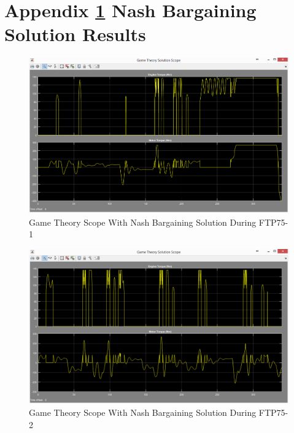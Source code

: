 \chapter{Appendix \ref{app:2} Nash Bargaining Solution Results}
\label{app:2}

\begin{figure}[h]
\centering
\includegraphics[scale=0.51]{figures/NashSolution/FTP75-1/gameTheory17Juni}
\caption{Game Theory Scope With Nash Bargaining Solution During FTP75-1}
\label{fig:gtns1}
\end{figure}

\begin{figure}[h]
\centering
\includegraphics[scale=0.49]{figures/NashSolution/FTP75-2/gameTheory19Juni}
\caption{Game Theory Scope With Nash Bargaining Solution During FTP75-2}
\label{fig:gtns2}
\end{figure}

